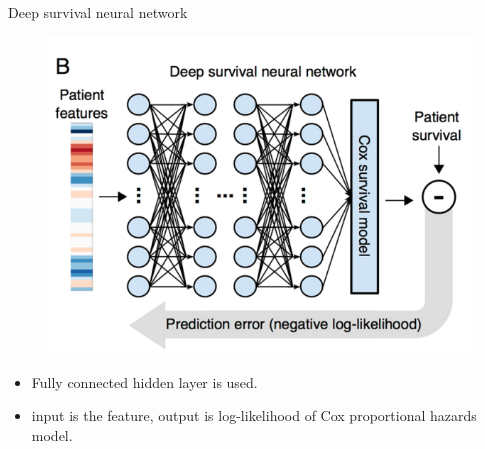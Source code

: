 \documentclass[
]{beamer}
\begin{document}
\begin{frame}[plain]{Deep survival neural network}
\begin{figure}
	\centering
	\includegraphics[scale=0.4]{nn1}
\end{figure}
\begin{itemize}
	\item Fully connected hidden layer is used. 
	\item input is the feature, output is log-likelihood of Cox proportional hazards model.
\end{itemize}
\end{frame}
\end{document}
